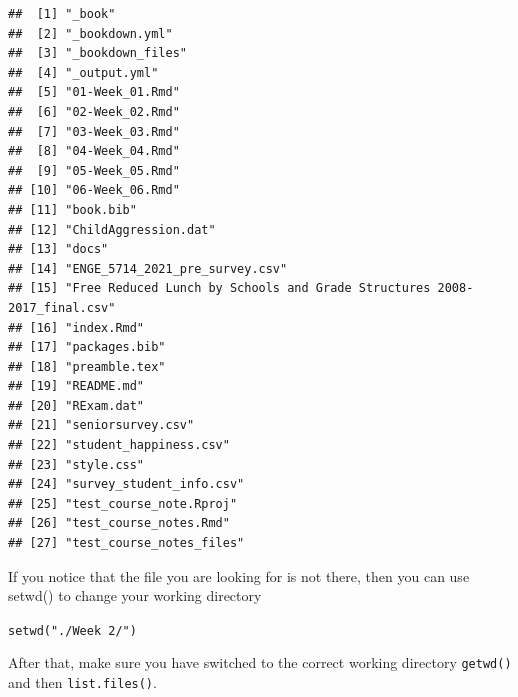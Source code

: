 \documentclass[
]{book}
\begin{document}
\begin{verbatim}
##  [1] "_book"                                                                 
##  [2] "_bookdown.yml"                                                         
##  [3] "_bookdown_files"                                                       
##  [4] "_output.yml"                                                           
##  [5] "01-Week_01.Rmd"                                                        
##  [6] "02-Week_02.Rmd"                                                        
##  [7] "03-Week_03.Rmd"                                                        
##  [8] "04-Week_04.Rmd"                                                        
##  [9] "05-Week_05.Rmd"                                                        
## [10] "06-Week_06.Rmd"                                                        
## [11] "book.bib"                                                              
## [12] "ChildAggression.dat"                                                   
## [13] "docs"                                                                  
## [14] "ENGE_5714_2021_pre_survey.csv"                                         
## [15] "Free Reduced Lunch by Schools and Grade Structures 2008-2017_final.csv"
## [16] "index.Rmd"                                                             
## [17] "packages.bib"                                                          
## [18] "preamble.tex"                                                          
## [19] "README.md"                                                             
## [20] "RExam.dat"                                                             
## [21] "seniorsurvey.csv"                                                      
## [22] "student_happiness.csv"                                                 
## [23] "style.css"                                                             
## [24] "survey_student_info.csv"                                               
## [25] "test_course_note.Rproj"                                                
## [26] "test_course_notes.Rmd"                                                 
## [27] "test_course_notes_files"
\end{verbatim}

If you notice that the file you are looking for is not there, then you can use setwd() to change your working directory

\texttt{setwd("./Week\ 2/")}

After that, make sure you have switched to the correct working directory
\texttt{getwd()} and then \texttt{list.files()}.
\end{document}

